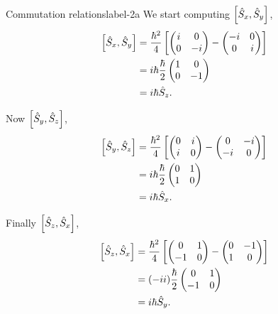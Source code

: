 \documentclass[../main.tex]{subfiles}
\begin{document}
\begin{sol}{Commutation relations}{label-2a}
    We start computing $\comm{\hat{S}_x}{\hat{S}_y}$,
    \begin{align*}
        \comm{\hat{S}_x}{\hat{S}_y} &=
            \frac{\hbar^2}{4}\left[
                \begin{pmatrix}i&0\\0&-i\end{pmatrix}
                -
                \begin{pmatrix}-i&0\\0&i\end{pmatrix}
            \right]
            \\
                                 &=i\hbar\frac{\hbar}{2}\begin{pmatrix}1&0\\0&-1\end{pmatrix}
                                 \\
                                 &=i\hbar\hat{S}_z.
    \end{align*}

    Now $\comm{\hat{S}_y}{\hat{S}_z}$,
    \begin{align*}
        \comm{\hat{S}_y}{\hat{S}_z} &=
            \frac{\hbar^2}{4}\left[
                \begin{pmatrix}0&i\\i&0\end{pmatrix}
                -
                \begin{pmatrix}0&-i\\-i&0\end{pmatrix}
            \right]
            \\
                                 &=i\hbar\frac{\hbar}{2}\begin{pmatrix}0&1\\1&0\end{pmatrix}
                                 \\
                                 &=i\hbar\hat{S}_x.
    \end{align*}

    Finally $\comm{\hat{S}_z}{\hat{S}_x}$,
    \begin{align*}
        \comm{\hat{S}_z}{\hat{S}_x} &=
            \frac{\hbar^2}{4}\left[
        \begin{pmatrix}0&1\\-1&0\end{pmatrix}
                -
                \begin{pmatrix}0&-1\\1&0\end{pmatrix}
            \right]
            \\
                                 &=\qty(-ii)\frac{\hbar}{2}\begin{pmatrix}0&1\\-1&0\end{pmatrix}
                                 \\
                                 &=i\hbar\hat{S}_y.
    \end{align*}


\end{sol}
\end{document}
